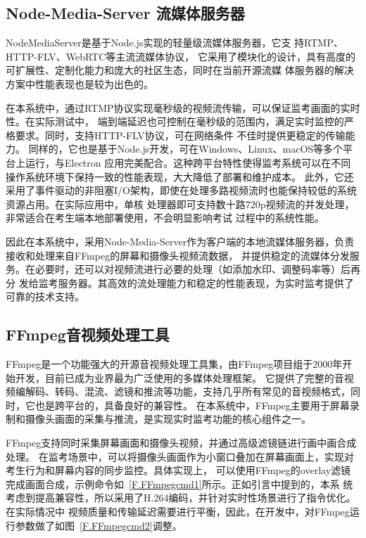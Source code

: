 \subsection{Node-Media-Server 流媒体服务器}

Node\-\hspace{0pt}Media\-\hspace{0pt}Server是基于Node.js实现的轻量级流媒体服务器，它支
持RTMP、\hspace{0pt}HTTP-FLV、\hspace{0pt}WebRTC等主流流媒体协议，
它采用了模块化的设计，具有高度的可扩展性、定制化能力和庞大的社区生态，同时在当前开源流媒
体服务器的解决方案中性能表现也是较为出色的。

在本系统中，通过RTMP协议实现毫秒级的视频流传输，可以保证监考画面的实时性。在实际测试中，
端到端延迟也可控制在毫秒级的范围内，满足实时监控的严格要求。同时，支持HTTP-FLV协议，可在网络条件
不佳时提供更稳定的传输能力。
同样的，它也是基于Node.js开发，可在Windows、Linux、macOS等多个平台上运行，与Electron
应用完美配合。这种跨平台特性使得监考系统可以在不同操作系统环境下保持一致的性能表现，大大降低了部署和维护成本。
此外，它还采用了事件驱动的非阻塞I/O架构，即使在处理多路视频流时也能保持较低的系统资源占用。在实际应用中，单核
处理器即可支持数十路720p视频流的并发处理，非常适合在考生端本地部署使用，不会明显影响考试
过程中的系统性能。

因此在本系统中，采用Node-Media-Server作为客户端的本地流媒体服务器，负责接收和处理来自FFmpeg的屏幕和摄像头视频流数据，
并提供稳定的流媒体分发服务。在必要时，还可以对视频流进行必要的处理（如添加水印、调整码率等）后再分
发给监考服务器。其高效的流处理能力和稳定的性能表现，为实时监考提供了可靠的技术支持。

\subsection{FFmpeg音视频处理工具}

FFmpeg是一个功能强大的开源音视频处理工具集，由FFmpeg项目组于2000年开始开发，目前已成为业界最为广泛使用的多媒体处理框架。
它提供了完整的音视频编解码、转码、混流、滤镜和推流等功能，支持几乎所有常见的音视频格式，同时，它也是跨平台的，具备良好的兼容性。
在本系统中，FFmpeg主要用于屏幕录制和摄像头画面的采集与推流，是实现实时监考功能的核心组件之一。


FFmpeg支持同时采集屏幕画面和摄像头视频，并通过高级滤镜链进行画中画合成处理。
在监考场景中，可以将摄像头画面作为小窗口叠加在屏幕画面上，实现对考生行为和屏幕内容的同步监控。具体实现上，
可以使用FFmpeg的overlay滤镜完成画面合成，示例命令如~\ref{F.FFmpegcmd1}所示。正如引言中提到的，本系
统考虑到提高兼容性，所以采用了H.264编码，并针对实时性场景进行了指令优化。在实际情况中
视频质量和传输延迟需要进行平衡，因此，在开发中，对FFmpeg运行参数做了如图~\ref{F.FFmpegcmd2}调整。


